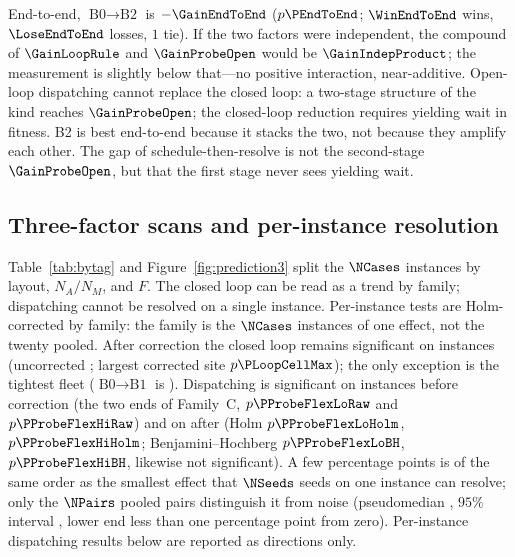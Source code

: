 End-to-end, $\text{B0}\to\text{B2}$ is $-\GainEndToEnd$ ($p\PEndToEnd$; $\WinEndToEnd$ wins, $\LoseEndToEnd$ losses, $1$ tie).
\label{sec:complement}
If the two factors were independent, the compound of $\GainLoopRule$ and $\GainProbeOpen$ would be $\GainIndepProduct$; the measurement is slightly below that---no positive interaction, near-additive.
Open-loop dispatching cannot replace the closed loop: a two-stage structure of the~\cite{sun2023integrated} kind reaches $\GainProbeOpen$; the closed-loop reduction requires yielding wait in fitness.
B2 is best end-to-end because it stacks the two, not because they amplify each other.
The gap of schedule-then-resolve is not the second-stage $\GainProbeOpen$, but that the first stage never sees yielding wait.

\subsection{Three-factor scans and per-instance resolution}
\label{sec:whichcongestion}

Table~\ref{tab:bytag} and Figure~\ref{fig:prediction3} split the $\NCases$ instances by layout, $N_A/N_M$, and $F$.
The closed loop can be read as a trend by family; dispatching cannot be resolved on a single instance.
Per-instance tests are Holm-corrected by family: the family is the $\NCases$ instances of one effect, not the twenty pooled.
After correction the closed loop remains significant on \CellsSigLoopAdj{} instances (uncorrected \CellsSigLoop{}; largest corrected site $p\PLoopCellMax$); the only exception is the tightest fleet ($\text{B0}\to\text{B1}$ is \GainLoopStarve{}).
Dispatching is significant on \CellsSigProbe{} instances before correction (the two ends of Family~C, $p\PProbeFlexLoRaw$ and $p\PProbeFlexHiRaw$) and on \CellsSigProbeAdj{} after (Holm $p\PProbeFlexLoHolm$, $p\PProbeFlexHiHolm$; Benjamini--Hochberg $p\PProbeFlexLoBH$, $p\PProbeFlexHiBH$, likewise not significant).
A few percentage points is of the same order as the smallest effect that $\NSeeds$ seeds on one instance can resolve; only the $\NPairs$ pooled pairs distinguish it from noise (pseudomedian \HLProbeLoop{}, $95\%$ interval \CIProbeLoop{}, lower end less than one percentage point from zero).
Per-instance dispatching results below are reported as directions only.

\begin{table}[t]
\caption{Per-instance ladder and the two effects, blocked by family ($n=\NSeeds$ seed-pairs).
Stars are Holm-corrected over the $\NCases$ instances of one effect ($^{*}p<0.05$, $^{**}p<0.01$);
$^{\dagger}$ is significant only before correction and is not read as a conclusion.
Negative is better.
Gain columns use the same pairwise-mean estimator as Table~\ref{tab:main}.
\texttt{A funnel} is the shared base point of Families~B and~C and occupies one row.}
\label{tab:bytag}
\small

\end{table}


